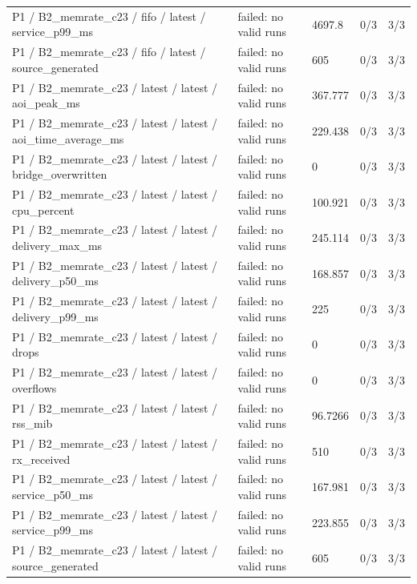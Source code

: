 \begin{tabular}{@{}lllll@{}}
P1 / B2\_memrate\_c23 / fifo / latest / service\_p99\_ms & failed: no valid runs & 4697.8 & 0/3 & 3/3 \\
P1 / B2\_memrate\_c23 / fifo / latest / source\_generated & failed: no valid runs & 605 & 0/3 & 3/3 \\
P1 / B2\_memrate\_c23 / latest / latest / aoi\_peak\_ms & failed: no valid runs & 367.777 & 0/3 & 3/3 \\
P1 / B2\_memrate\_c23 / latest / latest / aoi\_time\_average\_ms & failed: no valid runs & 229.438 & 0/3 & 3/3 \\
P1 / B2\_memrate\_c23 / latest / latest / bridge\_overwritten & failed: no valid runs & 0 & 0/3 & 3/3 \\
P1 / B2\_memrate\_c23 / latest / latest / cpu\_percent & failed: no valid runs & 100.921 & 0/3 & 3/3 \\
P1 / B2\_memrate\_c23 / latest / latest / delivery\_max\_ms & failed: no valid runs & 245.114 & 0/3 & 3/3 \\
P1 / B2\_memrate\_c23 / latest / latest / delivery\_p50\_ms & failed: no valid runs & 168.857 & 0/3 & 3/3 \\
P1 / B2\_memrate\_c23 / latest / latest / delivery\_p99\_ms & failed: no valid runs & 225 & 0/3 & 3/3 \\
P1 / B2\_memrate\_c23 / latest / latest / drops & failed: no valid runs & 0 & 0/3 & 3/3 \\
P1 / B2\_memrate\_c23 / latest / latest / overflows & failed: no valid runs & 0 & 0/3 & 3/3 \\
P1 / B2\_memrate\_c23 / latest / latest / rss\_mib & failed: no valid runs & 96.7266 & 0/3 & 3/3 \\
P1 / B2\_memrate\_c23 / latest / latest / rx\_received & failed: no valid runs & 510 & 0/3 & 3/3 \\
P1 / B2\_memrate\_c23 / latest / latest / service\_p50\_ms & failed: no valid runs & 167.981 & 0/3 & 3/3 \\
P1 / B2\_memrate\_c23 / latest / latest / service\_p99\_ms & failed: no valid runs & 223.855 & 0/3 & 3/3 \\
P1 / B2\_memrate\_c23 / latest / latest / source\_generated & failed: no valid runs & 605 & 0/3 & 3/3 \\
\bottomrule
\end{tabular}

